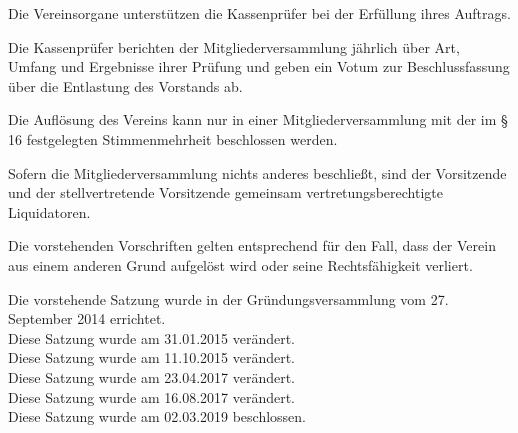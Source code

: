\begin{contract}
 Die Vereinsorgane unterstützen die Kassenprüfer bei der Erfüllung ihres Auftrags.
	
 Die Kassenprüfer berichten der Mitgliederversammlung jährlich über Art, Umfang und Ergebnisse ihrer Prüfung und geben ein Votum zur Beschlussfassung über die Entlastung des Vorstands ab.
	
 Die Auflösung des Vereins kann nur in einer Mitgliederversammlung mit der im § 16 festgelegten Stimmenmehrheit beschlossen werden. 
	
 Sofern die Mitgliederversammlung nichts anderes beschließt, sind der Vorsitzende und der stellvertretende Vorsitzende gemeinsam vertretungs\-be\-rech\-tigte Liquidatoren. 

	Die vorstehenden Vorschriften gelten entsprechend für den Fall, dass der Verein aus einem anderen Grund aufgelöst wird oder seine Rechtsfähigkeit verliert.
\end{contract}

Die vorstehende Satzung wurde in der Gründungsversammlung vom 27. September 2014 errichtet. \\
Diese Satzung wurde am 31.01.2015 verändert. \\
Diese Satzung wurde am 11.10.2015 verändert. \\
Diese Satzung wurde am 23.04.2017 verändert. \\
Diese Satzung wurde am 16.08.2017 verändert. \\
Diese Satzung wurde am 02.03.2019 beschlossen. \\

